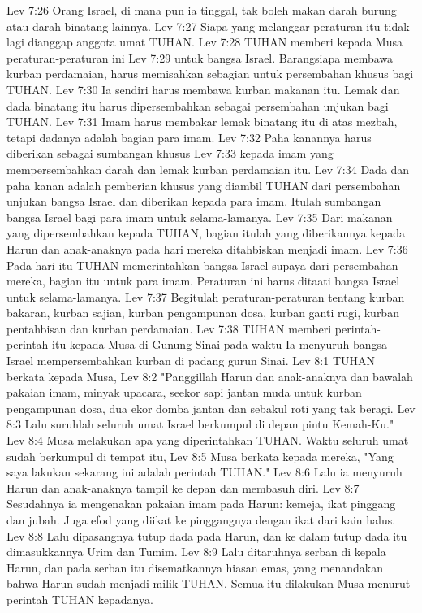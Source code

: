 Lev 7:26  Orang Israel, di mana pun ia tinggal, tak boleh makan darah burung atau darah binatang lainnya.
Lev 7:27  Siapa yang melanggar peraturan itu tidak lagi dianggap anggota umat TUHAN.
Lev 7:28  TUHAN memberi kepada Musa peraturan-peraturan ini
Lev 7:29  untuk bangsa Israel. Barangsiapa membawa kurban perdamaian, harus memisahkan sebagian untuk persembahan khusus bagi TUHAN.
Lev 7:30  Ia sendiri harus membawa kurban makanan itu. Lemak dan dada binatang itu harus dipersembahkan sebagai persembahan unjukan bagi TUHAN.
Lev 7:31  Imam harus membakar lemak binatang itu di atas mezbah, tetapi dadanya adalah bagian para imam.
Lev 7:32  Paha kanannya harus diberikan sebagai sumbangan khusus
Lev 7:33  kepada imam yang mempersembahkan darah dan lemak kurban perdamaian itu.
Lev 7:34  Dada dan paha kanan adalah pemberian khusus yang diambil TUHAN dari persembahan unjukan bangsa Israel dan diberikan kepada para imam. Itulah sumbangan bangsa Israel bagi para imam untuk selama-lamanya.
Lev 7:35  Dari makanan yang dipersembahkan kepada TUHAN, bagian itulah yang diberikannya kepada Harun dan anak-anaknya pada hari mereka ditahbiskan menjadi imam.
Lev 7:36  Pada hari itu TUHAN memerintahkan bangsa Israel supaya dari persembahan mereka, bagian itu untuk para imam. Peraturan ini harus ditaati bangsa Israel untuk selama-lamanya.
Lev 7:37  Begitulah peraturan-peraturan tentang kurban bakaran, kurban sajian, kurban pengampunan dosa, kurban ganti rugi, kurban pentahbisan dan kurban perdamaian.
Lev 7:38  TUHAN memberi perintah-perintah itu kepada Musa di Gunung Sinai pada waktu Ia menyuruh bangsa Israel mempersembahkan kurban di padang gurun Sinai.
Lev 8:1  TUHAN berkata kepada Musa,
Lev 8:2  "Panggillah Harun dan anak-anaknya dan bawalah pakaian imam, minyak upacara, seekor sapi jantan muda untuk kurban pengampunan dosa, dua ekor domba jantan dan sebakul roti yang tak beragi.
Lev 8:3  Lalu suruhlah seluruh umat Israel berkumpul di depan pintu Kemah-Ku."
Lev 8:4  Musa melakukan apa yang diperintahkan TUHAN. Waktu seluruh umat sudah berkumpul di tempat itu,
Lev 8:5  Musa berkata kepada mereka, "Yang saya lakukan sekarang ini adalah perintah TUHAN."
Lev 8:6  Lalu ia menyuruh Harun dan anak-anaknya tampil ke depan dan membasuh diri.
Lev 8:7  Sesudahnya ia mengenakan pakaian imam pada Harun: kemeja, ikat pinggang dan jubah. Juga efod yang diikat ke pinggangnya dengan ikat dari kain halus.
Lev 8:8  Lalu dipasangnya tutup dada pada Harun, dan ke dalam tutup dada itu dimasukkannya Urim dan Tumim.
Lev 8:9  Lalu ditaruhnya serban di kepala Harun, dan pada serban itu disematkannya hiasan emas, yang menandakan bahwa Harun sudah menjadi milik TUHAN. Semua itu dilakukan Musa menurut perintah TUHAN kepadanya.
